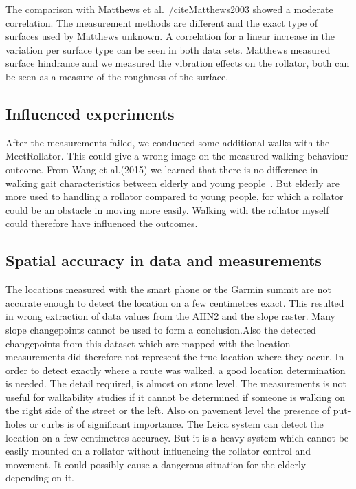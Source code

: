 The comparison with Matthews et al.~/cite{Matthews2003} showed a moderate correlation. The measurement methods are different and the exact type of surfaces used by Matthews unknown. A correlation for a linear increase in the variation per surface type can be seen in both data sets. Matthews measured surface hindrance and we measured the vibration effects on the rollator, both can be seen as a measure of the roughness of the surface. 

\subsection{Influenced experiments}
After the measurements failed, we conducted some additional walks with the MeetRollator. This could give a wrong image on the measured walking behaviour outcome. From Wang et al.(2015) we learned that there is no difference in walking gait characteristics between elderly and young people~\cite{Wang2015}. But elderly are more used to handling a rollator compared to young people, for which a rollator could be an obstacle in moving more easily. Walking with the rollator myself could therefore have influenced the outcomes. 

\subsection{Spatial accuracy in data and measurements}
The locations measured with the smart phone or the Garmin summit are not accurate enough to detect the location on a few centimetres exact. This resulted in wrong extraction of data values from the AHN2 and the slope raster. Many slope changepoints cannot be used to form a conclusion.Also the detected changepoints from this dataset which are mapped with the location measurements did therefore not represent the true location where they occur. 
 In order to detect exactly where a route was walked, a good location determination is needed. The detail required, is almost on stone level. The measurements is not useful for walkability studies if it cannot be determined if someone is walking on the right side of the street or the left. Also on pavement level the presence of put-holes or curbs is of significant importance. The Leica system can detect the location on a few centimetres accuracy. But it is a heavy system which cannot be easily mounted on a rollator without influencing the rollator control and movement. It could possibly cause a dangerous situation for the elderly depending on it. 

